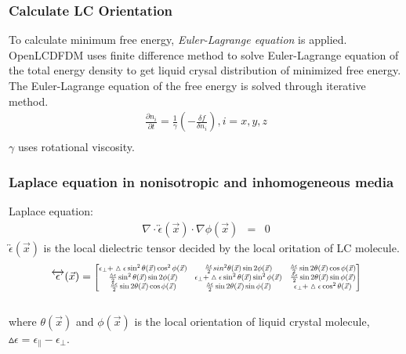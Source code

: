 \documentclass{beamer}
\newcommand\scalemath[2]{\scalebox{#1}{\mbox{\ensuremath{\displaystyle #2}}}} %
\begin{document}
\begin{frame}
\frametitle{Calculate LC Orientation}
To calculate minimum free energy, \emph{Euler-Lagrange equation} is applied. OpenLCDFDM uses finite difference method to solve Euler-Lagrange equation of the total energy density to get liquid crysal distribution of minimized free energy.\\
The Euler-Lagrange equation of the free energy is solved through iterative method.
\begin{eqnarray}
\frac{\partial n_i}{\partial t} = \frac{1}{\gamma} \left( -\frac{\delta f}{\delta n_i} \right), i = x, y, z \\ \nonumber
\end{eqnarray}
$\gamma$ uses rotational viscosity.
\end{frame}
\begin{frame}
\frametitle{Laplace equation in nonisotropic and inhomogeneous media}
Laplace equation:
\begin{eqnarray}
\nabla \cdot \overleftrightarrow{\epsilon}(\vec x) \cdot \nabla \phi(\vec x) &=& 0 \nonumber
\label{eq:laplace}
\end{eqnarray}
$\overleftrightarrow{\epsilon}(\vec x)$ is the local dielectric tensor decided by the local oritation of LC molecule. 
\\
\begin{eqnarray}
\overleftrightarrow{\epsilon}(\vec x) = 
\scalemath{0.7}{
\begin{bmatrix}
\epsilon_{\perp}+\vartriangle\epsilon \sin^2\theta(\vec{x})\cos^2\phi(\vec{x}) & \frac{\vartriangle\epsilon}{2} sin^2\theta(\vec{x})\sin 2\phi(\vec{x}) & \frac{\vartriangle\epsilon}{2} \sin 2\theta(\vec{x})\cos\phi(\vec{x}) \\
\frac{\vartriangle\epsilon}{2} \sin^2\theta(\vec{x})\sin 2\phi(\vec{x}) & \epsilon_{\perp}+\vartriangle\epsilon \sin^2\theta(\vec{x})\sin^2\phi(\vec{x}) & \frac{\vartriangle\epsilon}{2} \sin 2\theta(\vec{x})\sin\phi(\vec{x}) \\
\frac{\vartriangle\epsilon}{2} \sin 2\theta(\vec{x})\cos\phi(\vec{x}) & \frac{\vartriangle\epsilon}{2} \sin 2\theta(\vec{x})\sin\phi(\vec{x}) & \epsilon_{\perp}+\vartriangle\epsilon \cos^2\theta(\vec{x})\\ 
\end{bmatrix}}
\nonumber
\label{eq:dielectric_tensor}
\end{eqnarray}
\\
where $\theta(\vec{x})$ and $\phi(\vec{x})$ is the local orientation of liquid crystal molecule, $\vartriangle\epsilon = \epsilon_{\parallel}-\epsilon_{\perp}$.
\end{frame}
\end{document}
